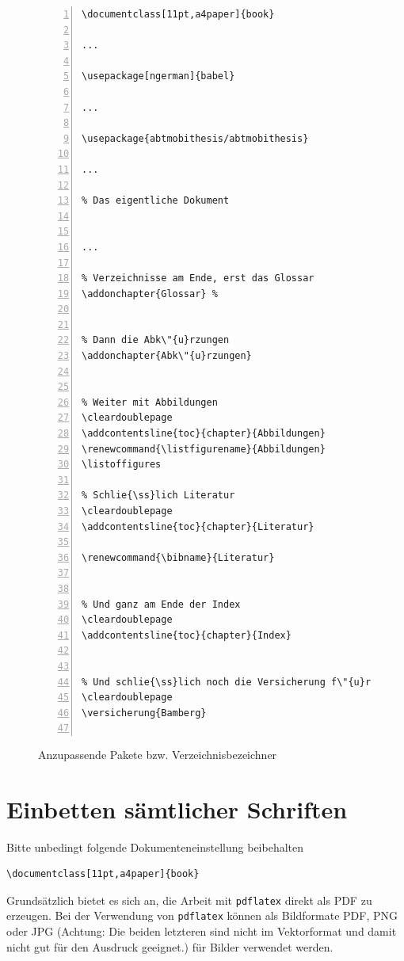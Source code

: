 \begin{figure}[htp]
\centering
\begin{Verbatim}[label=dissertation.tex,numberblanklines=false,fontsize=\scriptsize,numbers=left,frame=single]
\documentclass[11pt,a4paper]{book}

...

\usepackage[ngerman]{babel}

...

\usepackage{abtmobithesis/abtmobithesis}

...

% Das eigentliche Dokument


...

% Verzeichnisse am Ende, erst das Glossar
\addonchapter{Glossar} %


% Dann die Abk\"{u}rzungen
\addonchapter{Abk\"{u}rzungen}


% Weiter mit Abbildungen
\cleardoublepage
\addcontentsline{toc}{chapter}{Abbildungen}
\renewcommand{\listfigurename}{Abbildungen}
\listoffigures

% Schlie{\ss}lich Literatur
\cleardoublepage
\addcontentsline{toc}{chapter}{Literatur}

\renewcommand{\bibname}{Literatur}


% Und ganz am Ende der Index
\cleardoublepage
\addcontentsline{toc}{chapter}{Index}


% Und schlie{\ss}lich noch die Versicherung f\"{u}r das Pr\"{u}fungsamt
\cleardoublepage
\versicherung{Bamberg}


\end{Verbatim}
\caption{Anzupassende Pakete bzw. Verzeichnisbezeichner}\label{verzeichnisanpassung}
\end{figure}




\section{Einbetten s\"{a}mtlicher Schriften}\label{Schriften}
Bitte unbedingt folgende Dokumenteneinstellung beibehalten

\begin{verbatim}
\documentclass[11pt,a4paper]{book}
\end{verbatim}

Grunds\"{a}tzlich bietet es sich an, die Arbeit mit \texttt{pdflatex} direkt als PDF zu erzeugen. Bei der Verwendung von \texttt{pdflatex} k\"{o}nnen als Bildformate PDF, PNG oder JPG (Achtung: Die beiden letzteren sind nicht im Vektorformat und damit nicht gut f\"{u}r den Ausdruck geeignet.) f\"{u}r Bilder verwendet werden.

